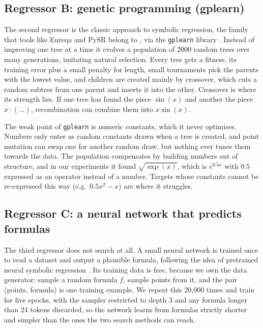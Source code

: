 \documentclass{article}
\begin{document}
\subsection{Regressor B: genetic programming (gplearn)}

The second regressor is the classic approach to symbolic regression, the
family that tools like Eureqa and PySR belong to \citep{cranmer2023interpretablemachinelearningscience}, via the
\texttt{gplearn} library \citep{gplearn}. Instead of improving one tree
at a time it evolves a population of 2000 random trees over many
generations, imitating natural selection. Every tree gets a fitness, its
training error plus a small penalty for length, small tournaments pick
the parents with the lowest value, and children are created mainly by
crossover, which cuts a random subtree from one parent and inserts it
into the other. Crossover is where its strength lies. If one tree has
found the piece $\sin(x)$ and another the piece $x \cdot (\dots)$,
recombination can combine them into $x \sin(x)$.

The weak point of \texttt{gplearn} is numeric constants, which it never
optimises. Numbers only enter as random constants drawn when a tree is
created, and point mutation can swap one for another random draw, but
nothing ever tunes them towards the data. The population compensates by
building numbers out of structure, and in our experiments it found
$\sqrt{\exp(x)}$, which is $e^{0.5x}$ with $0.5$ expressed as an
operator instead of a number. Targets whose constants cannot be
re-expressed this way (e.g.\ $0.5x^2 - x$) are where it struggles.

\subsection{Regressor C: a neural network that predicts formulas}

The third regressor does not search at all. A small neural network is
trained once to read a dataset and output a plausible formula, following
the idea of pretrained neural symbolic regression \citep{pmlr-v139-biggio21a}. Its
training data is free, because we own the data generator: sample a
random formula $f$, sample points from it, and the pair (points,
formula) is one training example. We repeat this 20{,}000 times and
train for five epochs, with the sampler restricted to depth 3 and any
formula longer than 24 tokens discarded, so the network learns from
formulas strictly shorter and simpler than the ones the two search
methods can reach.
\end{document}
